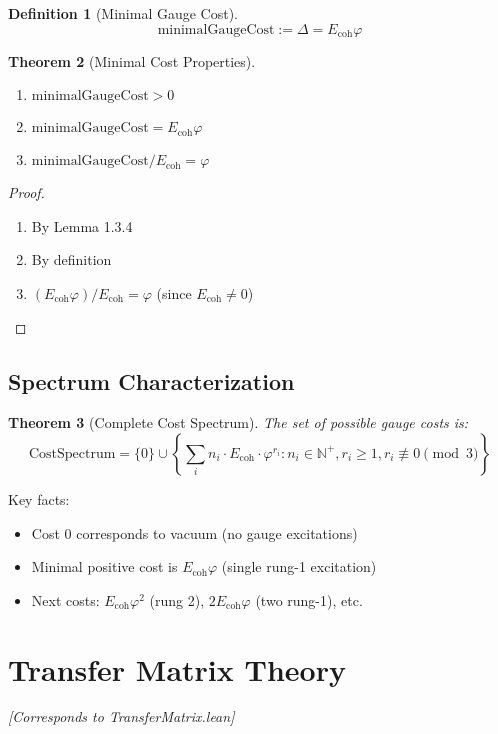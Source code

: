 \documentclass[11pt]{article}
\numberwithin{equation}{section}
\newtheorem{theorem}{Theorem}[section]
\newtheorem{definition}[theorem]{Definition}
\theoremstyle{remark}
\newcommand{\Ecoh}{E_{\text{coh}}}
\newcommand{\massGap}{\Delta}
\newcommand{\N}{\mathbb{N}}
\begin{document}
\begin{definition}[Minimal Gauge Cost]
\[\text{minimalGaugeCost} := \massGap = \Ecoh \varphi\]
\end{definition}

\begin{theorem}[Minimal Cost Properties]
\begin{enumerate}
\item $\text{minimalGaugeCost} > 0$
\item $\text{minimalGaugeCost} = \Ecoh \varphi$  
\item $\text{minimalGaugeCost} / \Ecoh = \varphi$
\end{enumerate}
\end{theorem}

\begin{proof}
\begin{enumerate}
\item By Lemma 1.3.4
\item By definition
\item $(\Ecoh \varphi) / \Ecoh = \varphi$ (since $\Ecoh \neq 0$)
\end{enumerate}
\end{proof}

\subsection{Spectrum Characterization}

\begin{theorem}[Complete Cost Spectrum]
The set of possible gauge costs is:
\[\text{CostSpectrum} = \{0\} \cup \left\{\sum_i n_i \cdot \Ecoh \cdot \varphi^{r_i} : n_i \in \N^+, r_i \geq 1, r_i \not\equiv 0 \pmod{3}\right\}\]
\end{theorem}

Key facts:
\begin{itemize}
\item Cost 0 corresponds to vacuum (no gauge excitations)
\item Minimal positive cost is $\Ecoh \varphi$ (single rung-1 excitation)
\item Next costs: $\Ecoh \varphi^2$ (rung 2), $2 \Ecoh \varphi$ (two rung-1), etc.
\end{itemize}

\section{Transfer Matrix Theory}
\textit{[Corresponds to TransferMatrix.lean]}
\end{document}
